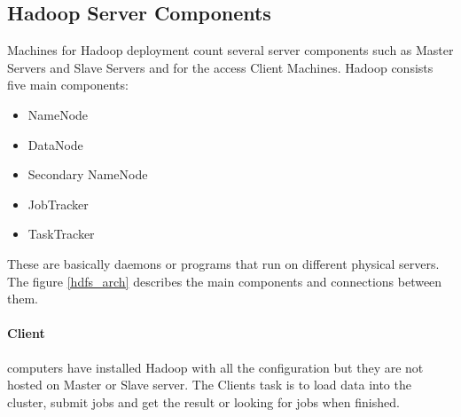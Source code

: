 \documentclass[a4paper,12pt,oneside]{report}
\begin{document}
	\subsection{Hadoop Server Components}
	Machines for Hadoop deployment count several server components such as Master
	Servers and Slave Servers and for the access Client Machines.  Hadoop consists
	five main components: 
	\begin{itemize}[noitemsep]
		\item NameNode
		\item DataNode
		\item Secondary NameNode
		\item JobTracker
		\item TaskTracker
	\end{itemize}
	These are basically daemons or programs that run on different physical servers.
	The figure \ref{hdfs_arch} describes the main components and connections
	between them.
	
	\paragraph{Client}
	computers have installed Hadoop with  all the configuration but they are not
	hosted on Master or Slave 
	server. The Clients task is to  load data into the cluster, submit jobs and get
	the result or looking for jobs when finished.
	
\end{document}
